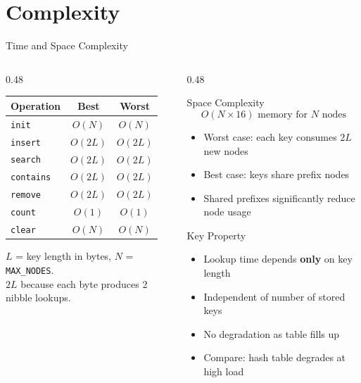 \documentclass[aspectratio=169, 10pt]{beamer}
\begin{document}
\section{Complexity}

\begin{frame}{Time and Space Complexity}
\begin{columns}[T]
\begin{column}{0.48\textwidth}
\begin{table}
\centering
\begin{tabular}{@{}lcc@{}}
\toprule
\textbf{Operation} & \textbf{Best} & \textbf{Worst} \\
\midrule
\texttt{init}     & $O(N)$ & $O(N)$ \\
\texttt{insert}   & $O(2L)$ & $O(2L)$ \\
\texttt{search}   & $O(2L)$ & $O(2L)$ \\
\texttt{contains} & $O(2L)$ & $O(2L)$ \\
\texttt{remove}   & $O(2L)$ & $O(2L)$ \\
\texttt{count}    & $O(1)$ & $O(1)$ \\
\texttt{clear}    & $O(N)$ & $O(N)$ \\
\bottomrule
\end{tabular}
\end{table}

\vspace{0.3em}
{\scriptsize $L$ = key length in bytes, $N$ = \texttt{MAX\_NODES}.\\
$2L$ because each byte produces 2 nibble lookups.}
\end{column}

\begin{column}{0.48\textwidth}
\begin{block}{Space Complexity}
\[
  O(N \times 16) \text{ memory for } N \text{ nodes}
\]
\begin{itemize}
  \item Worst case: each key consumes $2L$ new nodes
  \item Best case: keys share prefix nodes
  \item Shared prefixes significantly reduce node usage
\end{itemize}
\end{block}

\vspace{0.3em}
\begin{block}{Key Property}
\begin{itemize}
  \item Lookup time depends \textbf{only} on key length
  \item Independent of number of stored keys
  \item No degradation as table fills up
  \item Compare: hash table degrades at high load
\end{itemize}
\end{block}
\end{column}
\end{columns}


\end{frame}
\end{document}

